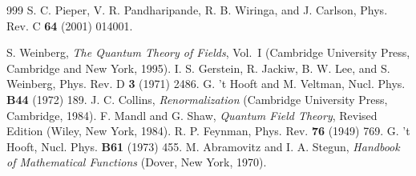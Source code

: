 \documentclass[sort&compress,preprint,3p]{elsarticle}
\begin{document}
\begin{thebibliography}{999}
S. C. Pieper, V. R. Pandharipande, R.  B. Wiringa, and J. Carlson,
Phys. Rev. C {\bf 64} (2001) 014001.

 S. Weinberg,
{\it The Quantum Theory of Fields}, Vol.\ I 
(Cambridge University Press, Cambridge and New York, 1995).
 I. S. Gerstein, R. Jackiw, B. W. Lee, and S. Weinberg,
Phys. Rev. D {\bf 3} (1971) 2486.
 G. 't Hooft and M. Veltman, Nucl. Phys. {\bf B44} (1972) 189.
 J. C. Collins, {\it Renormalization} (Cambridge University Press,
Cambridge, 1984).
 F. Mandl and G. Shaw, {\it Quantum Field Theory},
Revised Edition (Wiley, New York, 1984).
 R. P. Feynman, Phys. Rev. {\bf 76} (1949) 769.
 G. 't Hooft, Nucl. Phys. {\bf B61} (1973) 455.
 M. Abramovitz and I. A. Stegun, {\it Handbook of Mathematical
Functions} (Dover, New York, 1970).
\end{thebibliography}
\end{document}
